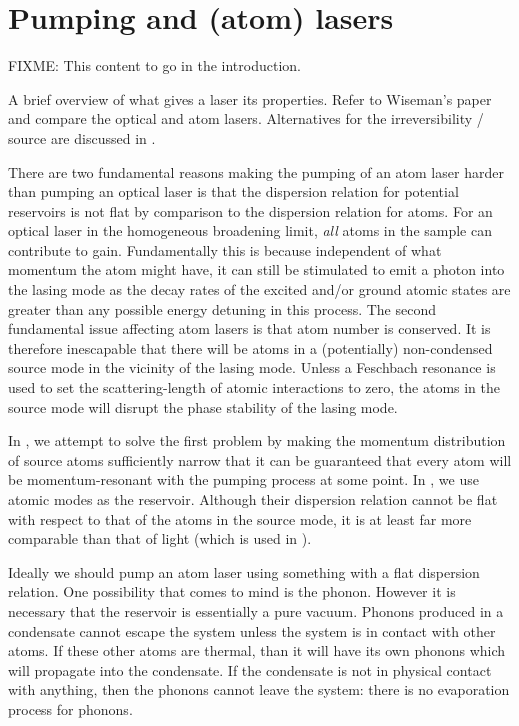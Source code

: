 \section{Pumping and (atom) lasers}
\label{Introduction:Pumping}

FIXME: This content to go in the introduction.

A brief overview of what gives a laser its properties. Refer to Wiseman's paper~\citep{Wiseman:1997ba} and compare the optical and atom lasers. Alternatives for the irreversibility / source are discussed in .

There are two fundamental reasons making the pumping of an atom laser harder than pumping an optical laser is that the dispersion relation for potential reservoirs is not flat by comparison to the dispersion relation for atoms.  For an optical laser in the homogeneous broadening limit, \emph{all} atoms in the sample can contribute to gain.  Fundamentally this is because independent of what momentum the atom might have, it can still be stimulated to emit a photon into the lasing mode as the decay rates of the excited and/or ground atomic states are greater than any possible energy detuning in this process.  The second fundamental issue affecting atom lasers is that atom number is conserved.  It is therefore inescapable that there will be atoms in a (potentially) non-condensed source mode in the vicinity of the lasing mode.  Unless a Feschbach resonance is used to set the scattering-length of atomic interactions to zero, the atoms in the source mode will disrupt the phase stability of the lasing mode.

In , we attempt to solve the first problem by making the momentum distribution of source atoms sufficiently narrow that it can be guaranteed that every atom will be momentum-resonant with the pumping process at some point.  In , we use atomic modes as the reservoir.  Although their dispersion relation cannot be flat with respect to that of the atoms in the source mode, it is at least far more comparable than that of light (which is used in ).

Ideally we should pump an atom laser using something with a flat dispersion relation.  One possibility that comes to mind is the phonon.  However it is necessary that the reservoir is essentially a pure vacuum.  Phonons produced in a condensate cannot escape the system unless the system is in contact with other atoms.  If these other atoms are thermal, than it will have its own phonons which will propagate into the condensate.  If the condensate is not in physical contact with anything, then the phonons cannot leave the system: there is no evaporation process for phonons.

